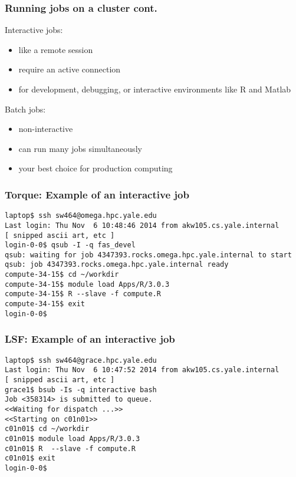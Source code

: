 \documentclass[10pt]{beamer}
\begin{document}
\begin{frame}[fragile]
\frametitle{Running jobs on a cluster cont.}

Interactive jobs:
\begin{itemize}
\item like a remote session
\item require an active connection
\item for development, debugging, or 
interactive environments like R and Matlab 
\end{itemize}
\vskip10pt

Batch jobs:
\begin{itemize}
\item non-interactive  
\item can run many jobs simultaneously
\item your best choice for production computing
\end{itemize}
\end{frame}

\begin{frame}[fragile]
\frametitle{Torque: Example of an interactive job}
\begin{verbatim}
laptop$ ssh sw464@omega.hpc.yale.edu
Last login: Thu Nov  6 10:48:46 2014 from akw105.cs.yale.internal
[ snipped ascii art, etc ]
login-0-0$ qsub -I -q fas_devel
qsub: waiting for job 4347393.rocks.omega.hpc.yale.internal to start
qsub: job 4347393.rocks.omega.hpc.yale.internal ready
compute-34-15$ cd ~/workdir
compute-34-15$ module load Apps/R/3.0.3
compute-34-15$ R --slave -f compute.R
compute-34-15$ exit 
login-0-0$ 
\end{verbatim}
\end{frame}

\begin{frame}[fragile]
\frametitle{LSF: Example of an interactive job}
\begin{verbatim}
laptop$ ssh sw464@grace.hpc.yale.edu
Last login: Thu Nov  6 10:47:52 2014 from akw105.cs.yale.internal
[ snipped ascii art, etc ]
grace1$ bsub -Is -q interactive bash
Job <358314> is submitted to queue.
<<Waiting for dispatch ...>>
<<Starting on c01n01>>
c01n01$ cd ~/workdir
c01n01$ module load Apps/R/3.0.3
c01n01$ R  --slave -f compute.R
c01n01$ exit 
login-0-0$ 
\end{verbatim}
\end{frame}
\end{document}
